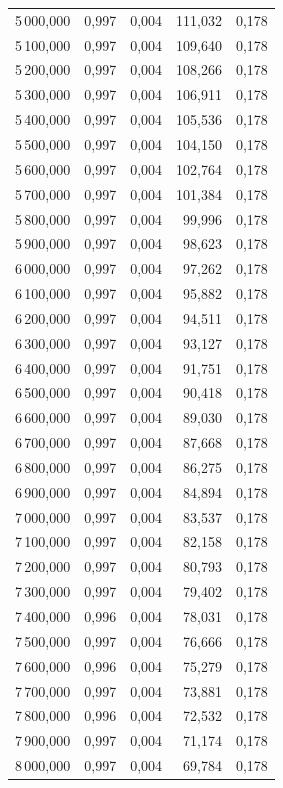 \begin{longtable}{rrrrr}
5\,000,000 & 0,997 & 0,004 & 111,032 & 0,178\\
5\,100,000 & 0,997 & 0,004 & 109,640 & 0,178\\
5\,200,000 & 0,997 & 0,004 & 108,266 & 0,178\\
5\,300,000 & 0,997 & 0,004 & 106,911 & 0,178\\
5\,400,000 & 0,997 & 0,004 & 105,536 & 0,178\\
5\,500,000 & 0,997 & 0,004 & 104,150 & 0,178\\
5\,600,000 & 0,997 & 0,004 & 102,764 & 0,178\\
5\,700,000 & 0,997 & 0,004 & 101,384 & 0,178\\
5\,800,000 & 0,997 & 0,004 & 99,996 & 0,178\\
5\,900,000 & 0,997 & 0,004 & 98,623 & 0,178\\
6\,000,000 & 0,997 & 0,004 & 97,262 & 0,178\\
6\,100,000 & 0,997 & 0,004 & 95,882 & 0,178\\
6\,200,000 & 0,997 & 0,004 & 94,511 & 0,178\\
6\,300,000 & 0,997 & 0,004 & 93,127 & 0,178\\
6\,400,000 & 0,997 & 0,004 & 91,751 & 0,178\\
6\,500,000 & 0,997 & 0,004 & 90,418 & 0,178\\
6\,600,000 & 0,997 & 0,004 & 89,030 & 0,178\\
6\,700,000 & 0,997 & 0,004 & 87,668 & 0,178\\
6\,800,000 & 0,997 & 0,004 & 86,275 & 0,178\\
6\,900,000 & 0,997 & 0,004 & 84,894 & 0,178\\
7\,000,000 & 0,997 & 0,004 & 83,537 & 0,178\\
7\,100,000 & 0,997 & 0,004 & 82,158 & 0,178\\
7\,200,000 & 0,997 & 0,004 & 80,793 & 0,178\\
7\,300,000 & 0,997 & 0,004 & 79,402 & 0,178\\
7\,400,000 & 0,996 & 0,004 & 78,031 & 0,178\\
7\,500,000 & 0,997 & 0,004 & 76,666 & 0,178\\
7\,600,000 & 0,996 & 0,004 & 75,279 & 0,178\\
7\,700,000 & 0,997 & 0,004 & 73,881 & 0,178\\
7\,800,000 & 0,996 & 0,004 & 72,532 & 0,178\\
7\,900,000 & 0,997 & 0,004 & 71,174 & 0,178\\
8\,000,000 & 0,997 & 0,004 & 69,784 & 0,178\\

\end{longtable}
